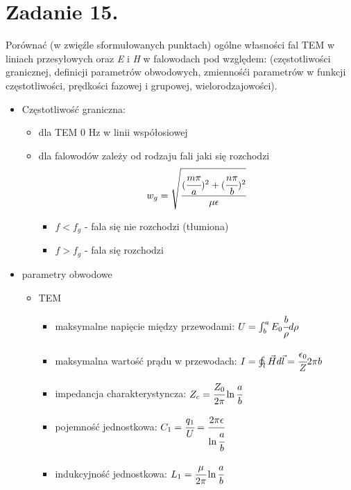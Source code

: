 \section*{Zadanie 15.}
\begin{task}
Porównać (w zwięźle sformułowanych punktach) ogólne własności fal TEM w liniach przesyłowych oraz \textsl{E}
i \textsl{H} w falowodach pod względem: (częstotliwości granicznej, definicji parametrów obwodowych, zmiennośći
parametrów w funkcji częstotliwości, prędkości fazowej i grupowej, wielorodzajowości).\\
\end{task}

\begin{solution}

\begin{itemize}
\item Częstotliwość graniczna:
    \begin{itemize}
    \item dla TEM 0 Hz w linii współosiowej
    \item dla falowodów zależy od rodzaju fali jaki się rozchodzi
        $$w_{g}=\sqrt{\cfrac{(\cfrac{m\pi}{a})^{2} + (\cfrac{n\pi}{b})^{2}}{\mu\epsilon}} $$
        \begin{itemize}
        \item $f<f_{g}$ - fala się nie rozchodzi (tłumiona)
        \item $f>f_{g}$ - fala się rozchodzi
        \end{itemize}
    \end{itemize}
\item parametry obwodowe
    \begin{itemize}
        \item TEM 
        \begin{itemize}
            \item maksymalne napięcie między przewodami:
                $U= \int_{b}^{a}E_{0}\cfrac{b}{\rho}d\rho$
            \item maksymalna wartość prądu w przewodach:
                $I=\oint_{l}\vec{H}d\vec{l}=\cfrac{\epsilon_{0}}{Z}2\pi b $
            \item impedancja charakterystyncza: 
                $Z_{c}=\cfrac{Z_{0}}{2\pi}\ln{\cfrac{a}{b}} $  
            \item pojemność jednostkowa:
                $C_{1}=\cfrac{q_{1}}{U}=\cfrac{2\pi\epsilon}{\ln{\cfrac{a}{b}}} $
            \item indukcyjność jednostkowa:
                $L_{1}=\cfrac{\mu}{2\pi}\ln{\cfrac{a}{b}} $

\end{itemize}
\end{itemize}
\end{itemize}
\end{solution}
